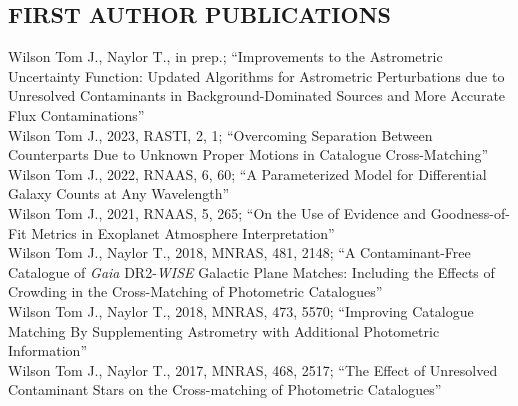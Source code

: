 \documentclass[letter, margin, 10pt]{res} %
\begin{document}
\begin{resume}
\parskip 5pt
\vspace{-2pt}
\section{FIRST AUTHOR PUBLICATIONS}
Wilson Tom J., Naylor T., in prep.; ``Improvements to the Astrometric Uncertainty Function: Updated Algorithms for Astrometric Perturbations due to Unresolved Contaminants in Background-Dominated Sources and More Accurate Flux Contaminations''\\
Wilson Tom J., 2023, RASTI, 2, 1; ``Overcoming Separation Between Counterparts Due to Unknown Proper Motions in Catalogue Cross-Matching''\\
Wilson Tom J., 2022, RNAAS, 6, 60; ``A Parameterized Model for Differential Galaxy Counts at Any Wavelength''\\
Wilson Tom J., 2021, RNAAS, 5, 265; ``On the Use of Evidence and Goodness-of-Fit Metrics in Exoplanet Atmosphere Interpretation''\\
Wilson Tom J., Naylor T., 2018, MNRAS, 481, 2148; ``A Contaminant-Free Catalogue of \textit{Gaia} DR2-\textit{WISE} Galactic Plane Matches: Including the Effects of Crowding in the Cross-Matching of Photometric Catalogues''\vspace{2pt}\\
Wilson Tom J., Naylor T., 2018, MNRAS, 473, 5570; ``Improving Catalogue Matching By Supplementing Astrometry with Additional Photometric Information''\vspace{2pt}\\
Wilson Tom J., Naylor T., 2017, MNRAS, 468, 2517; ``The Effect of Unresolved Contaminant Stars on the Cross-matching of Photometric Catalogues''
\vspace{-5pt}

\end{resume}
\end{document}
